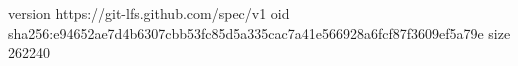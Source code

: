 version https://git-lfs.github.com/spec/v1
oid sha256:e94652ae7d4b6307cbb53fc85d5a335cac7a41e566928a6fcf87f3609ef5a79e
size 262240
